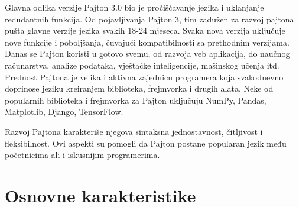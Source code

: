 Glavna odlika verzije Pajton 3.0 bio je pročišćavanje jezika i uklanjanje redudantnih funkcija.
Od pojavljivanja Pajton 3, tim zadužen za razvoj pajtona pušta glavne verzije jezika svakih 18-24 mjeseca. Svaka nova verzija uključuje nove funkcije i poboljšanja, čuvajući kompatibilnosti sa prethodnim verzijama.
Danas se Pajton koristi u gotovo svemu, od razvoja veb aplikacija, do naučnog računarstva, analize podataka, vještačke inteligencije, mašinskog učenja itd. Prednost 
Pajtona je velika i aktivna zajednicu programera koja   svakodnevno doprinose  jeziku kreiranjem biblioteka, frejmvorka i drugih alata. Neke od popularnih biblioteka i frejmvorka za Pajton uključuju NumPy, Pandas, Matplotlib, Django, TensorFlow.


Razvoj Pajtona karakteriše njegova sintaksna jednostavnost, čitljivost i fleksibilnost. Ovi aspekti su pomogli  da Pajton postane popularan jezik među početnicima ali i iskusnijim  programerima.

\section{Osnovne karakteristike}

